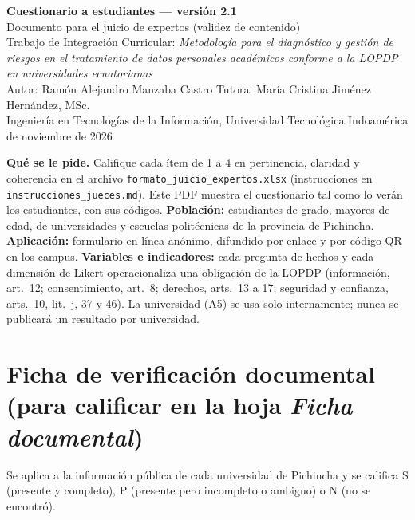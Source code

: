 \documentclass[11pt,a4paper]{article}
\begin{document}
\begin{center}
{\large\textbf{Cuestionario a estudiantes --- versión 2.1}}\\[2pt]
Documento para el juicio de expertos (validez de contenido)\\[2pt]
\small Trabajo de Integración Curricular: \textit{Metodología para el diagnóstico y gestión de riesgos en el tratamiento de datos personales académicos conforme a la LOPDP en universidades ecuatorianas}\\
Autor: Ramón Alejandro Manzaba Castro \quad Tutora: María Cristina Jiménez Hernández, MSc.\\
Ingeniería en Tecnologías de la Información, Universidad Tecnológica Indoamérica  de noviembre de 2026
\end{center}

\textbf{Qué se le pide.} Califique cada ítem de 1 a 4 en pertinencia, claridad y coherencia en el archivo \texttt{formato\_juicio\_expertos.xlsx} (instrucciones en \texttt{instrucciones\_jueces.md}). Este PDF muestra el cuestionario tal como lo verán los estudiantes, con sus códigos. \textbf{Población:} estudiantes de grado, mayores de edad, de universidades y escuelas politécnicas de la provincia de Pichincha. \textbf{Aplicación:} formulario en línea anónimo, difundido por enlace y por código QR en los campus. \textbf{Variables e indicadores:} cada pregunta de hechos y cada dimensión de Likert operacionaliza una obligación de la LOPDP (información, art.~12; consentimiento, art.~8; derechos, arts.~13 a 17; seguridad y confianza, arts.~10, lit.~j, 37 y 46). La universidad (A5) se usa solo internamente; nunca se publicará un resultado por universidad.



\section*{Ficha de verificación documental (para calificar en la hoja \textit{Ficha documental})}

Se aplica a la información pública de cada universidad de Pichincha y se califica S (presente y completo), P (presente pero incompleto o ambiguo) o N (no se encontró).
\end{document}

